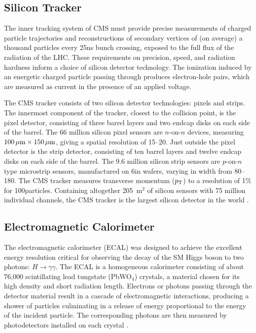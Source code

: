 \pagebreak
\subsection{Silicon Tracker}
The inner tracking system of CMS must provide precise measurements of charged particle trajectories and reconstructions of secondary vertices of (on average) a thousand particles every 25\unit{ns} bunch crossing, exposed to the full flux of the radiation of the LHC.
These requirements on precision, speed, and radiation hardness inform a choice of silicon detector technology.
The ionization induced by an energetic charged particle passing through produces electron-hole pairs, which are measured as current in the presence of an applied voltage.

The CMS tracker consists of two silicon detector technologies: pixels and strips.
The innermost component of the tracker, closest to the collision point, is the pixel detector, consisting of three barrel layers and two endcap disks on each side of the barrel.
The 66 million silicon pixel sensors are $n$-on-$n$ devices, measuring $100 \,\mu\text{m} \times 150 \,\mu\text{m}$, giving a spatial resolution of 15--20\mum.
Just outside the pixel detector is the strip detector, consisting of ten barrel layers and twelve endcap disks on each side of the barrel.
The 9.6 million silicon strip sensors are $p$-on-$n$ type microstrip sensors, manufactured on 6\unit{in} wafers, varying in width from 80--180\mum.
The CMS tracker measures transverse momentum ($p_{\mathrm{T}}$) to a resolution of 1\% for 100\GeV particles.
Containing altogether 205~$\text{m}^2$ of silicon sensors with 75 million individual channels, the CMS tracker is the largest silicon detector in the world \cite{Chatrchyan:2008zzk, CERN-LHCC-98-006, HARTMANN201225}.


\subsection{Electromagnetic Calorimeter}
The electromagnetic calorimeter (ECAL) was designed to achieve the excellent energy resolution critical for observing the decay of the SM Higgs boson to two photons: $H \to \gamma\gamma$.
The ECAL is a homogeneous calorimeter consisting of about 76,000 scintillating lead tungstate (PbWO$_4$) crystals, a material chosen for its high density and short radiation length.
Electrons or photons passing through the detector material result in a cascade of electromagnetic interactions, producing a shower of particles culminating in a release of energy proportional to the energy of the incident particle.
The corresponding photons are then measured by photodetectors installed on each crystal \cite{Chatrchyan:2008zzk, CERN-LHCC-97-033, Fabjan:692252}.

